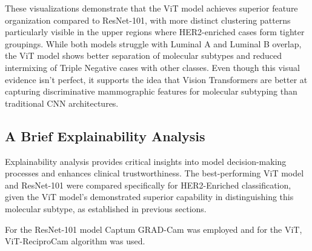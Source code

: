 \documentclass[a4paper,10pt]{book}
\begin{document}
These visualizations demonstrate that the ViT model achieves superior feature organization compared to ResNet-101, with more distinct clustering patterns particularly visible in the upper regions where HER2-enriched cases form tighter groupings. While both models struggle with Luminal A and Luminal B overlap, the ViT model shows better separation of molecular subtypes and reduced intermixing of Triple Negative cases with other classes. Even though this visual evidence isn't perfect, it supports the idea that Vision Transformers are better at capturing discriminative mammographic features for molecular subtyping than traditional CNN architectures.

\subsection{A Brief Explainability Analysis}

Explainability analysis provides critical insights into model decision-making processes and enhances clinical trustworthiness. The best-performing ViT model and ResNet-101 were compared specifically for HER2-Enriched classification, given the ViT model's demonstrated superior capability in distinguishing this molecular subtype, as established in previous sections.

For the ResNet-101 model Captum \cite{noauthor_captum_nodate, noauthor_161002391_nodate} GRAD-Cam was employed and for the ViT, ViT-ReciproCam \cite{byun_vit-reciprocam_2023} algorithm was used.
\end{document}
